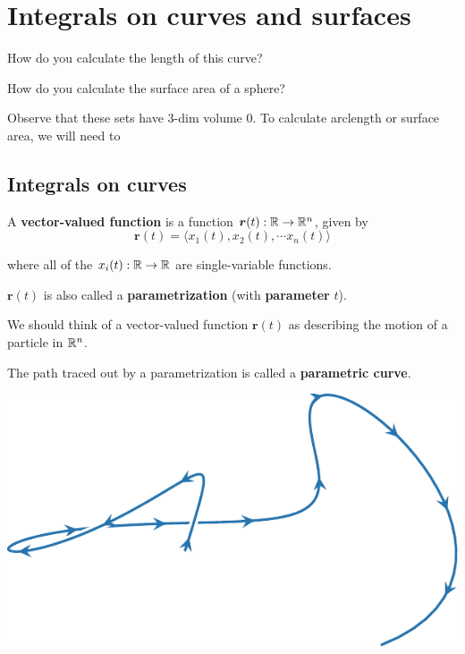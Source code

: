 \section{Integrals on curves and surfaces}

\begin{motivating}
How do you calculate the length of this curve?
\end{motivating}


\begin{motivating}
How do you calculate the surface area of a sphere?
\end{motivating}


Observe that these sets have $3$-dim volume 0.  To calculate arclength or surface area, we will need to 

\subsection{Integrals on curves}



\begin{definition}
    A \textbf{vector-valued function} is a function $\bm{r}(t): \mathbb{R} \to \mathbb{R}^n$, given by
    $$\bm{r}(t) = \langle x_1(t),x_2(t), \cdots x_n(t) \rangle$$
    
    where all of the $x_i(t) : \mathbb{R} \to \mathbb{R}$ are single-variable functions.
    
    $\bm{r}(t)$ is also called a \textbf{parametrization} (with \textbf{parameter} $t$).
    \end{definition}


    We should think of a vector-valued function $\bm{r}(t)$ as describing the motion of a particle in $\mathbb{R}^n$. 

    \begin{definition}
    The path traced out by a parametrization is called a \textbf{parametric curve}.
    \end{definition}

\begin{center}
        \includegraphics{chapters/5-IntegrationManifolds/figures/figures-paramcurve.pdf}
\end{center}

